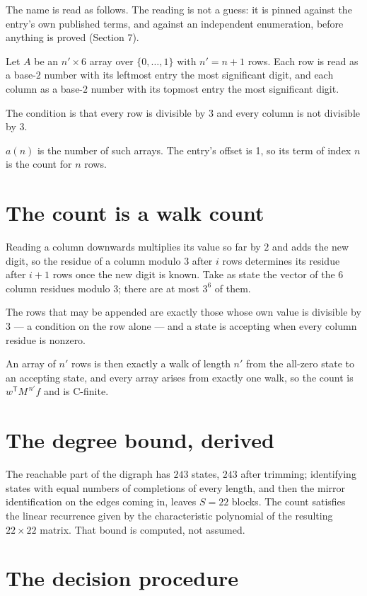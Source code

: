 \documentclass[11pt]{article}
\theoremstyle{definition}
\begin{document}
The name is read as follows. The reading is not a guess: it is pinned against the entry's own published terms, and against an independent enumeration, before anything is proved (Section 7).

Let $A$ be an $n' \times 6$ array over $\{0,\dots,1\}$ with $n' = n + 1$ rows. Each row is read as a base-$2$ number with its leftmost entry the most significant digit, and each column as a base-$2$ number with its topmost entry the most significant digit.

The condition is that every row is divisible by $3$ and every column is not divisible by $3$.

$a(n)$ is the number of such arrays. The entry's offset is 1, so its term of index $n$ is the count for $n$ rows.

\section{The count is a walk count}

Reading a column downwards multiplies its value so far by $2$ and adds the new digit, so the residue of a column modulo $3$ after $i$ rows determines its residue after $i+1$ rows once the new digit is known. Take as state the vector of the $6$ column residues modulo $3$; there are at most $3^{6}$ of them.

The rows that may be appended are exactly those whose own value is divisible by $3$ --- a condition on the row alone --- and a state is accepting when every column residue is nonzero.

An array of $n'$ rows is then exactly a walk of length $n'$ from the all-zero state to an accepting state, and every array arises from exactly one walk, so the count is $w^{\mathsf T}M^{\,n'}f$ and is C-finite.

\section{The degree bound, derived}

The reachable part of the digraph has $243$ states, $243$ after trimming; identifying states with equal numbers of completions of every length, and then the mirror identification on the edges coming in, leaves $S = 22$ blocks. The count satisfies the linear recurrence given by the characteristic polynomial of the resulting $22\times22$ matrix. That bound is computed, not assumed.

\section{The decision procedure}
\end{document}
